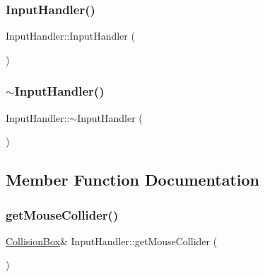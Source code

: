 \subsubsection{\texorpdfstring{InputHandler()}{InputHandler()}}
{\footnotesize\ttfamily Input\+Handler\+::\+Input\+Handler (\begin{DoxyParamCaption}{ }\end{DoxyParamCaption})}

\mbox{\label{class_input_handler_ac1f7efb54b34d433d6ffba62627452b6}} 
\subsubsection{\texorpdfstring{$\sim$InputHandler()}{~InputHandler()}}
{\footnotesize\ttfamily Input\+Handler\+::$\sim$\+Input\+Handler (\begin{DoxyParamCaption}{ }\end{DoxyParamCaption})}



\subsection{Member Function Documentation}
\mbox{\label{class_input_handler_ab3598f14563df47bfaa4573ba2986636}} 
\subsubsection{\texorpdfstring{getMouseCollider()}{getMouseCollider()}}
{\footnotesize\ttfamily \mbox{\hyperlink{class_collision_box}{Collision\+Box}}\& Input\+Handler\+::get\+Mouse\+Collider (\begin{DoxyParamCaption}{ }\end{DoxyParamCaption})\hspace{0.3cm}{\ttfamily [inline]}}

\mbox{\label{class_input_handler_a97d80f9648d4e6a313b7706d790bf7b0}} 
